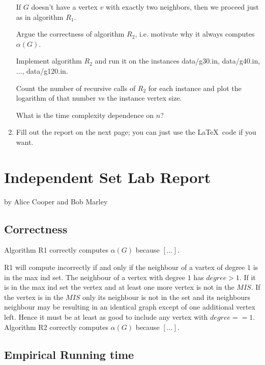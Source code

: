 \documentclass{tufte-handout}
\begin{document}
\begin{enumerate}
  If $G$ doesn't have a vertex $v$ with exactly two neighbors, then we
  proceed just as in algorithm $R_1$.
 
 Argue the correctness of algorithm $R_2$, i.e. motivate why it always computes $\alpha(G)$.
 
 Implement algorithm $R_2$ and run it on the instances
  data/g30.in, data/g40.in, $\ldots$, data/g120.in.

  Count the number of recursive calls of $R_2$ for each instance and plot the
  logarithm of that number vs the instance vertex size. 
  
  What is the time complexity dependence on $n$?

\item Fill out the report on the next page; you can just use the
  \LaTeX\ code if you want.
\end{enumerate}

\newpage


\newpage
\section{Independent Set Lab Report}


by Alice Cooper and Bob Marley

\subsection{Correctness}
Algorithm R1 correctly computes $\alpha(G)$ because $[\ldots]$.

R1 will compute incorrectly if and only if the neighbour of a vartex of degree
$1$ is in the max ind set. The neighbour of a vertex with degree $1$ has $degree >
1$. If it is in the max ind set the vertex and at least one more vertex is not
in the $MIS$. If the vertex is in the $MIS$ only its neighbour is not in the set
and its neighbours neighbour may be resulting in an identical graph except of
one additional vertex left. Hence it must be at least as good to include any
vertex with $degree == 1$.
\noindent
Algorithm R2 correctly computes $\alpha(G)$ because $[\ldots]$.

\subsection{Empirical Running time}
\end{document}
